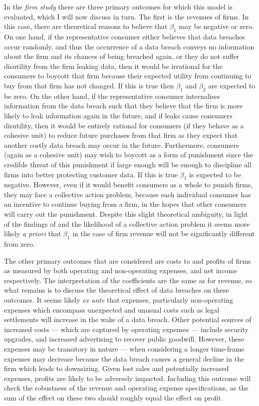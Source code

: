 \documentclass[../Main.tex]{subfiles}
\begin{document}
In the \textit{firm study} there are three primary outcomes for which this model is evaluated, which I will now discuss in turn. The first is the revenues of firms. In this case, there are theoretical reasons to believe that $\beta_1$ may be negative or zero. On one hand, if the representative consumer either believes that data breaches occur randomly, and thus the occurrence of a data breach conveys no information about the firm and its chances of being breached again, or they do not suffer disutility from the firm leaking data, then it would be irrational for the consumers to boycott that firm because their expected utility from continuing to buy from that firm has not changed. If this is true then $\beta_1$ and $\beta_2$ are expected to be zero. On the other hand, if the representative consumer internalises information from the data breach such that they believe that the firm is more likely to leak information again in the future, and if leaks cause consumers disutility, then it would be entirely rational for consumers (if they behave as a cohesive unit) to reduce future purchases from that firm as they expect that another costly data breach may occur in the future. Furthermore, consumers (again as a cohesive unit) may wish to boycott as a form of punishment since the credible threat of this punishment if large enough will be enough to discipline all firms into better protecting customer data. If this is true $\beta_1$ is expected to be negative. However, even if it would benefit consumers as a whole to punish firms, they may face a collective action problem, because each individual consumer has an incentive to continue buying from a firm, in the hopes that other consumers will carry out the punishment. Despite this slight theoretical ambiguity, in light of the findings of \cite{davis2009} and the likelihood of a collective action problem it seems more likely \textit{a priori} that $\beta_1$ in the case of firm revenue will not be significantly different from zero.

The other primary outcomes that are considered are costs to and profits of firms as measured by both operating and non-operating expenses, and net income respectively. The interpretation of the coefficients are the same as for revenue, so what remains is to discuss the theoretical effect of data breaches on these outcomes. It seems likely \textit{ex ante} that expenses, particularly non-operating expenses which encompass unexpected and unusual costs such as legal settlements will increase in the wake of a data breach. Other potential sources of increased costs --- which are captured by operating expenses --- include security upgrades, and increased advertising to recover public goodwill. However, these expenses may be transitory in nature --- when considering a longer time-frame expenses may decrease because the data breach causes a general decline in the firm which leads to downsizing. Given lost sales and potentially increased expenses, profits are likely to be adversely impacted. Including this outcome will check the robustness of the revenue and operating expense specifications, as the sum of the effect on these two should roughly equal the effect on profit. 
\end{document}
